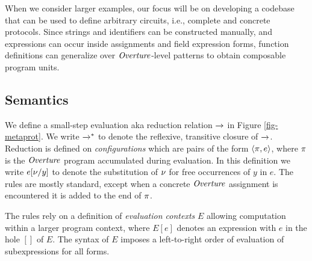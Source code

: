 When we consider larger examples, our
focus will be on developing a codebase that can be used to define
arbitrary circuits, i.e., complete and concrete protocols. Since
strings and identifiers can be constructed manually, and expressions
can occur inside assignments and field expression forms, function
definitions can generalize over $\mathit{Overture}$-level patterns to obtain
composable program units.
\subsection{Semantics}

We define a small-step evaluation aka reduction relation $\xrightarrow{}$ in
Figure \ref{fig-metaprot}.  We write $\xrightarrow{}^{*}$ to denote the
reflexive, transitive closure of $\xrightarrow{}$. Reduction is defined on
\emph{configurations} which are pairs of the form $\langle \pi,e \rangle$,
where $\pi$ is the $\mathit{Overture}$ program accumulated during evaluation.
In this definition we write $e[\nu/y]$ to denote the substitution of $\nu$
for free occurrences of $y$ in $e$. The rules are mostly standard,
except when a concrete $\mathit{Overture}$ assignment is encountered it is added
to the end of $\pi$.

The rules rely on a definition of \emph{evaluation contexts} $E$
allowing computation within a larger program context, where $E[e]$
denotes an expression with $e$ in the hole $[]$ of $E$. The syntax
of $E$ imposes a left-to-right order of evaluation of subexpressions
for all forms.
